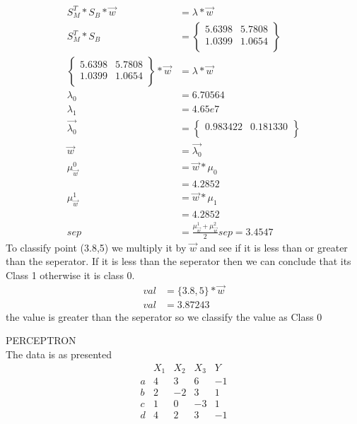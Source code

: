 \documentclass[12pt,english]{article}
\begin{document}
\begin{equation}
\begin{split}
S_{M}^{T} * S_{B} * \vec{w} & = \lambda * \vec{w}\\
S_{M}^{T} * S_{B} &= 
\begin{Bmatrix}
5.6398 & 5.7808 \\
1.0399 & 1.0654 \\
\end{Bmatrix}\\
\begin{Bmatrix}
5.6398 & 5.7808 \\
1.0399 & 1.0654 \\
\end{Bmatrix}
*\vec{w} &= \lambda * \vec{w}\\
\lambda_0 &= 6.70564\\
\lambda_1 &= 4.65e7\\
\vec{\lambda_0} &= 
\begin{Bmatrix}
0.983422 & 0.181330 \\
\end{Bmatrix}\\
\vec{w} &= \vec{\lambda_0}\\
\mu_{\vec{w}}^{0} &= \vec{w} * \mu_0\\
&= 4.2852\\
\mu_{\vec{w}}^{1} &= \vec{w} * \mu_1\\
&= 4.2852\\
sep &= \frac{\mu_{\vec{w}}^{1} + \mu_{\vec{w}}^{2}}{2}
sep = 3.4547
\end{split} 
\end{equation}
To classify point (3.8,5) we multiply it by $\vec{w}$ and see if it is less than  or greater than the seperator. If it is less than the seperator then we can conclude that its Class 1 otherwise it is class 0.
\begin{equation}
\begin{split}
val &= \{3.8,5\} * \vec{w}\\
val &= 3.87243
\end{split}
\end{equation}
the value is greater than the seperator so we classify the value as Class 0\par
PERCEPTRON\\
The data is as presented\\
\begin{equation}
\begin{array}{c|ccc|c}
 & X_1 &  X_2  &  X_3 & Y\\
\hline
a &4 &  3  &  6 & -1\\
\hline
b& 2 &  -2  & 3 & 1\\
\hline
c & 1 & 0  & -3 & 1\\
\hline
d& 4 & 2  & 3 & -1\\
\end{array}
\end{equation}
\end{document}
